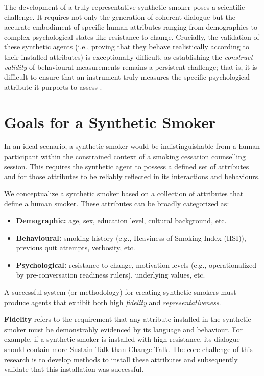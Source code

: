 The development of a truly representative synthetic smoker poses a scientific
challenge. It requires not only the generation of coherent dialogue but the accurate
embodiment of specific human attributes ranging from demographics to complex
psychological states like resistance to change. Crucially, the validation of these
synthetic agents (i.e., proving that they behave realistically according to their
installed attributes) is exceptionally difficult, as establishing the \textit{construct
	validity} of behavioural measurements remains a persistent challenge; that is, it is
difficult to ensure that an instrument truly measures the specific psychological
attribute it purports to assess \cite{Cronbach1955}.

\section{Goals for a Synthetic Smoker}
\label{sec:synthetic-smoker-ideal}

In an ideal scenario, a synthetic smoker would be indistinguishable from a human
participant within the constrained context of a smoking cessation counselling session.
This requires the synthetic agent to possess a defined set of attributes and for those
attributes to be reliably reflected in its interactions and behaviours.

We conceptualize a synthetic smoker based on a collection of attributes that define a
human smoker. These attributes can be broadly categorized as:

\begin{itemize}
	\item \textbf{Demographic:} age, sex, education level, cultural background, etc.
	\item \textbf{Behavioural:} smoking history (e.g., Heaviness of Smoking Index (HSI)), previous quit attempts, verbosity, etc.
	\item \textbf{Psychological:} resistance to change, motivation levels (e.g., operationalized by pre-conversation readiness rulers), underlying values, etc.
\end{itemize}

A successful system (or methodology) for creating synthetic smokers must produce agents
that exhibit both high \emph{fidelity} and \emph{representativeness}.

\textbf{Fidelity} refers to the requirement that any attribute installed in the synthetic smoker must be demonstrably evidenced by its language and behaviour. For example, if a synthetic smoker is installed with high resistance, its dialogue should contain more Sustain Talk than Change Talk. The core challenge of this research is to develop methods to install these attributes and subsequently validate that this installation was successful.

